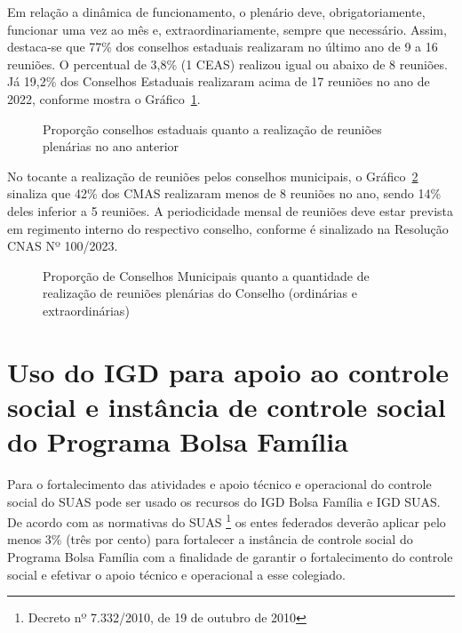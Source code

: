 \documentclass[
  letterpaper,
  DIV=11,
  numbers=noendperiod]{scrreprt}
\begin{document}
Em relação a dinâmica de funcionamento, o plenário deve,
obrigatoriamente, funcionar uma vez ao mês e, extraordinariamente,
sempre que necessário. Assim, destaca-se que 77\% dos conselhos
estaduais realizaram no último ano de 9 a 16 reuniões. O percentual de
3,8\% (1 CEAS) realizou igual ou abaixo de 8 reuniões. Já 19,2\% dos
Conselhos Estaduais realizaram acima de 17 reuniões no ano de 2022,
conforme mostra o Gráfico~\ref{fig-qtdceas_reuniao}.

\begin{figure}


\caption{\label{fig-qtdceas_reuniao}Proporção conselhos estaduais quanto
a realização de reuniões plenárias no ano anterior}

\end{figure}%

No tocante a realização de reuniões pelos conselhos municipais, o
Gráfico~\ref{fig-qtdcmas_reuniao} sinaliza que 42\% dos CMAS realizaram
menos de 8 reuniões no ano, sendo 14\% deles inferior a 5 reuniões. A
periodicidade mensal de reuniões deve estar prevista em regimento
interno do respectivo conselho, conforme é sinalizado na Resolução CNAS
Nº 100/2023.

\begin{figure}


\caption{\label{fig-qtdcmas_reuniao}Proporção de Conselhos Municipais
quanto a quantidade de realização de reuniões plenárias do Conselho
(ordinárias e extraordinárias)}

\end{figure}%

\section{Uso do IGD para apoio ao controle social e instância de
controle social do Programa Bolsa
Família}\label{uso-do-igd-para-apoio-ao-controle-social-e-instuxe2ncia-de-controle-social-do-programa-bolsa-famuxedlia}

Para o fortalecimento das atividades e apoio técnico e operacional do
controle social do SUAS pode ser usado os recursos do IGD Bolsa Família
e IGD SUAS. De acordo com as normativas do SUAS \footnote{Decreto nº
  7.332/2010, de 19 de outubro de 2010} os entes federados deverão
aplicar pelo menos 3\% (três por cento) para fortalecer a instância de
controle social do Programa Bolsa Família com a finalidade de garantir o
fortalecimento do controle social e efetivar o apoio técnico e
operacional a esse colegiado.
\end{document}
